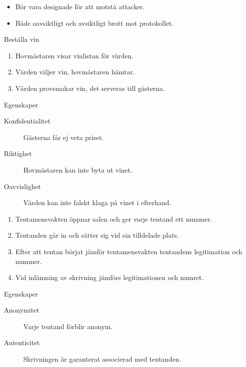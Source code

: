 \documentclass{beamer}
\theoremstyle{definition}
\theoremstyle{remark}
\begin{document}
\begin{frame}{\insertsubsectionhead}
  \begin{itemize}
    \item Bör vara designade för att motstå attacker.
    \item Både oavsiktligt och avsiktligt brott mot protokollet.
  \end{itemize}
\end{frame}

\begin{frame}{\insertsubsectionhead}
  \begin{example}{Beställa vin}
    \begin{enumerate}
      \item Hovmästaren visar vinlistan för värden.
      \item Värden väljer vin, hovmästaren hämtar.
      \item Värden provsmakar vin, det serveras till gästerna.
    \end{enumerate}
  \end{example}
  \begin{block}{Egenskaper}
    \begin{description}
      \item[Konfidentialitet] Gästerna får ej veta priset.
      \item[Riktighet] Hovmästaren kan inte byta ut vinet.
      \item[Oavvislighet] Värden kan inte falskt klaga på vinet i efterhand.
    \end{description}
  \end{block}
\end{frame}

\begin{frame}{\insertsubsectionhead}
  \begin{example}
    \begin{enumerate}
      \item Tentamensvakten öppnar salen och ger varje tentand ett nummer.
      \item Tentanden går in och sätter sig vid sin tilldelade plats.
      \item Efter att tentan börjat jämför tentamensvakten tentandens 
        legitimation och nummer.
      \item Vid inlämning av skrivning jämförs legitimationen och numret.
    \end{enumerate}
  \end{example}
  \begin{block}{Egenskaper}
    \begin{description}
      \item[Anonymitet] Varje tentand förblir anonym.
      \item[Autenticitet] Skrivningen är garanterat associerad med tentanden.
    \end{description}
  \end{block}
\end{frame}
\end{document}
